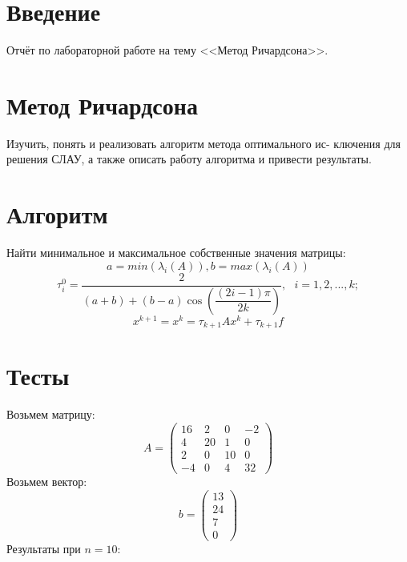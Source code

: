 \documentclass[14pt, titlepage,fleqn]{extarticle}
\begin{document}
	

	
	
	\newpage
	
	\tableofcontents   
	\clearpage
	\section*{Введение}
	Отчёт по лабораторной работе на тему <<Метод Ричардсона>>.	
	\newpage









	\section*{Метод Ричардсона}
	Изучить, понять и реализовать алгоритм метода оптимального ис-
	ключения для решения СЛАУ, а также описать работу алгоритма и
	привести результаты.

	\section*{Алгоритм}
	Найти минимальное и максимальное собственные значения матрицы:
	\[a = min(\lambda_i(A)), b = max(\lambda_i(A))\]	
	\[\tau^{0}_i = \dfrac{2}{(a + b) + (b-a)\cos\left(\dfrac{(2i-1)\pi}{2k}\right)},~~~i=1,2,...,k; \]
	\[x^{k+1} = x^k = \tau_{k+1}Ax^k + \tau_{k+1}f\]
	\section*{Тесты}
	Возьмем матрицу:
	\[A = \begin{pmatrix}
		16& 2& 0& -2\\
        4& 20& 1& 0\\
        2& 0& 10& 0\\
        -4& 0& 4& 32
	\end{pmatrix}\]
	Возьмем вектор:
	\[b =\begin{pmatrix}
		13\\
		24\\
		7\\
		0
	\end{pmatrix} \]
	\newpage
	Результаты при $n=10$:
	\begin{figure}[H]
	\end{figure}
\end{document}
